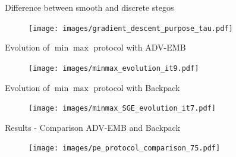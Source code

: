 \documentclass[10pt]{beamer}
\begin{document}
\begin{frame}{Difference between smooth and discrete stegos}
    \begin{figure}[h]
        \texttt{[image: images/gradient\_descent\_purpose\_tau.pdf]}
    \end{figure}
\end{frame}





\begin{frame}{Evolution of $\min\max$ protocol with ADV-EMB}
   \begin{figure}
        \texttt{[image: images/minmax\_evolution\_it9.pdf]}
    \end{figure}

\end{frame}


\begin{frame}{Evolution of $\min\max$ protocol with Backpack}
    \begin{figure}
        \texttt{[image: images/minmax\_SGE\_evolution\_it7.pdf]}
    \end{figure}
\end{frame}



\begin{frame}{Results - Comparison ADV-EMB and Backpack}
    \begin{figure}[h]
        \texttt{[image: images/pe\_protocol\_comparison\_75.pdf]}
    \end{figure}
\end{frame}
\end{document}
